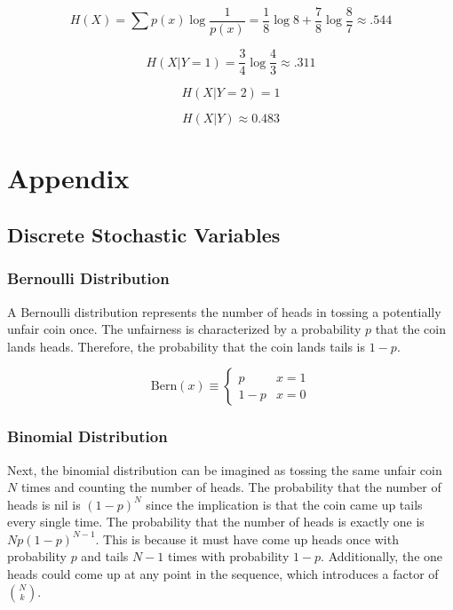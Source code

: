 \documentclass[13pt,oneside]{tufte-book}
\theoremstyle{definition}
\theoremstyle{definition}
\theoremstyle{definition}
\theoremstyle{remark}
\let\BeginKnitrBlock\begin \let\EndKnitrBlock\end
\begin{document}
\BeginKnitrBlock{solution}
{} \[
H(X) = \sum p(x) \log \frac{1}{p(x)} = \frac{1}{8} \log 8 + \frac{7}{8}\log \frac{8}{7} \approx .544
\]

\[
H(X | Y = 1) = \frac{3}{4}\log \frac{4}{3} \approx .311
\]

\[
H(X | Y = 2) = 1
\]

\[
H(X|Y) \approx 0.483
\]
\EndKnitrBlock{solution}

\part*{Appendix}\label{part-appendix}

\appendix


\hypertarget{discrete-stochastic-variables}{\chapter{Discrete Stochastic
Variables}\label{discrete-stochastic-variables}}

\section{Bernoulli Distribution}\label{bernoulli-distribution}

A Bernoulli distribution represents the number of heads in tossing a
potentially unfair coin once. The unfairness is characterized by a
probability \(p\) that the coin lands heads. Therefore, the probability
that the coin lands tails is \(1-p\).

\BeginKnitrBlock{definition}[Bernoulli Distribution]
\protect\hypertarget{def:unnamed-chunk-98}{}{\label{def:unnamed-chunk-98}
{} }

\begin{equation}
\mathrm{Bern}(x) \equiv \begin{cases}
p & x = 1 \\
1-p & x = 0
\end{cases}
\end{equation}
\EndKnitrBlock{definition}

\section{Binomial Distribution}\label{binomial-distribution}

Next, the binomial distribution can be imagined as tossing the same
unfair coin \(N\) times and counting the number of heads. The
probability that the number of heads is nil is \((1-p)^N\) since the
implication is that the coin came up tails every single time. The
probability that the number of heads is exactly one is
\(Np(1-p)^{N-1}\). This is because it must have come up heads once with
probability \(p\) and tails \(N-1\) times with probability \(1-p\).
Additionally, the one heads could come up at any point in the sequence,
which introduces a factor of \(\binom{N}{k}\).
\end{document}
